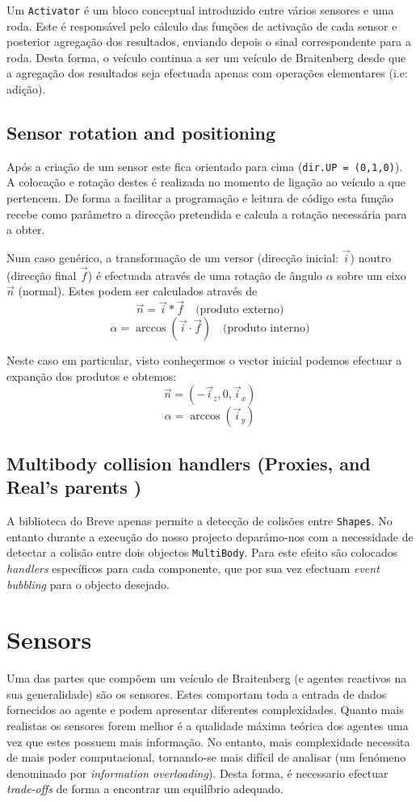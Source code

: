 \documentclass[a4paper]{article}
\begin{document}
Um \texttt{Activator} é um bloco conceptual introduzido entre vários sensores e uma roda.
Este é responsável pelo cálculo das funções de activação de cada sensor e posterior agregação dos resultados, enviando depois o sinal correspondente para a roda. Desta forma, o veículo continua a ser um veículo de Braitenberg desde que a agregação dos resultados seja efectuada apenas com operações elementares (i.e: adição). 

\subsection{Sensor rotation and positioning}
\indent \indent Após a criação de um sensor este fica orientado para cima (\texttt{dir.UP = (0,1,0)}).
A colocação e rotação destes é realizada no momento de ligação ao veículo a que pertencem.
De forma a facilitar a programação e leitura de código esta função recebe como parâmetro a direcção pretendida e calcula a rotação necessária para a obter.

Num caso genérico, a transformação de um versor (direcção inicial: $\vec{i}$) noutro (direcção final $\vec{f}$) é efectuada através de uma rotação de ângulo $\alpha$ sobre um eixo $\vec{n}$ (normal).
Estes podem ser calculados através de
\[
	\vec{n} = \vec{i}\ast\vec{f} \quad \text{(produto externo)}
\]
\[	
	\alpha = \arccos{(\vec{i} \cdot \vec{f})} \quad \text{(produto interno)}
\]

Neste caso em particular, visto conheçermos o vector inicial podemos efectuar a expanção dos produtos e obtemos:
\[
	\vec{n} = (-\vec{i}_{z}, 0, \vec{i}_{x})
\]
\[	
	\alpha = \arccos{(\vec{i}_{y})}
\]

\subsection{Multibody collision handlers (Proxies, and Real's parents )}
\indent \indent A biblioteca do Breve apenas permite a detecção de colisões entre \texttt{Shapes}. 
No entanto durante a execução do nosso projecto deparámo-nos com a necessidade de detectar a colisão entre dois objectos \texttt{MultiBody}.
Para este efeito são colocados \emph{handlers} específicos para cada componente, que por sua vez efectuam \emph{event bubbling} para o objecto desejado.

\cleardoublepage
\section{Sensors}
\indent \indent Uma das partes que compõem um veículo de Braitenberg (e agentes reactivos na sua generalidade) são os sensores.
Estes comportam toda a entrada de dados fornecidos ao agente e podem apresentar diferentes complexidades.
Quanto mais realistas os sensores forem melhor é a qualidade máxima teórica dos agentes uma vez que estes possuem mais informação.
No entanto, mais complexidade necessita de mais poder computacional, tornando-se mais difícil de analisar (um fenómeno denominado por \emph{information overloading}).
Desta forma, é necessario efectuar \emph{trade-offs} de forma a encontrar um equilíbrio adequado.
\end{document}
